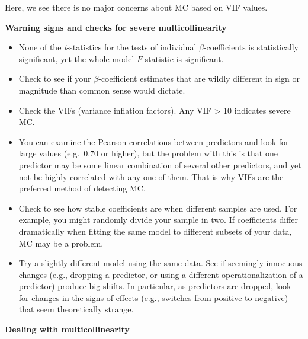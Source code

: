 \documentclass[
]{book}
\providecommand{\tightlist}{%
  \setlength{\itemsep}{0pt}\setlength{\parskip}{0pt}}
\begin{document}
Here, we see there is no major concerns about MC based on VIF values.

\textbf{Warning signs and checks for severe multicollinearity}

\begin{itemize}
\tightlist
\item
  None of the \emph{t}-statistics for the tests of individual \(\beta\)-coefficients is statistically significant, yet the whole-model \(F\)-statistic is significant.
\item
  Check to see if your \(\beta\)-coefficient estimates that are wildly different in sign or magnitude than common sense would dictate.
\item
  Check the VIFs (variance inflation factors). Any VIF \textgreater{} 10 indicates severe MC.
\item
  You can examine the Pearson correlations between predictors and look for large values (e.g.~0.70 or higher), but the problem with this is that one predictor may be some linear combination of several other predictors, and yet not be highly correlated with any one of them. That is why VIFs are the preferred method of detecting MC.
\item
  Check to see how stable coefficients are when different samples are used. For example, you might randomly divide your sample in two. If coefficients differ dramatically when fitting the same model to different subsets of your data, MC may be a problem.
\item
  Try a slightly different model using the same data. See if seemingly innocuous changes (e.g., dropping a predictor, or using a different operationalization of a predictor) produce big shifts. In particular, as predictors are dropped, look for changes in the signs of effects (e.g., switches from positive to negative) that seem theoretically strange.
\end{itemize}

\textbf{Dealing with multicollinearity}
\end{document}
